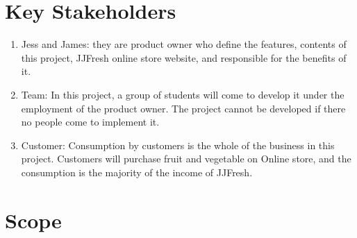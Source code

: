 \documentclass{report}
\begin{document}
\section{Key Stakeholders}
\begin{enumerate}
  \item Jess and James: they are product owner who define the features, contents of this project, JJFresh online store website, and responsible for the benefits of it.
  \item Team: In this project, a group of students will come to develop it under the employment of the product owner. The project cannot be developed if there no people come to implement it.
  \item Customer: Consumption by customers is the whole of the business in this project. Customers will purchase fruit and vegetable on Online store, and the consumption is the majority of the income of JJFresh.
\end{enumerate}

\section{Scope}
\end{document}
